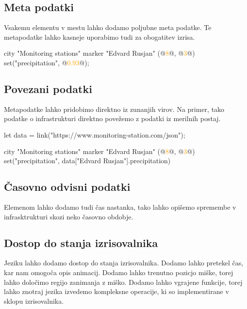 \documentclass{article}
\newcommand\Num[1]{\textcolor{orange}{#1}}
\begin{document}
\subsection{Meta podatki}
Vsakemu elementu v mestu lahko dodamo poljubne meta podatke.
Te metapodatke lahko kasneje uporabimo tudi za obogatitev izrisa.

\begin{CITY}
  city "Monitoring stations" {
    marker "Edvard Rusjan" (@\Num{8}@, @\Num{3}@) {
      set("precipitation", @\Num{0.93}@);
    }
  }
\end{CITY}

\subsection{Povezani podatki}
Metapodatke lahko pridobimo direktno iz zunanjih virov.
Na primer, tako podatke o infrastrukturi direktno povežemo z podatki iz merilnih postaj.

\begin{CITY}
  let data = link("https://www.monitoring-station.com/json");

  city "Monitoring stations" {
    marker "Edvard Rusjan" (@\Num{8}@, @\Num{3}@) {
      set("precipitation", data["Edvard Rusjan"].precipitation)
    }
  }
\end{CITY}

\subsection{Časovno odvisni podatki}
Elemenom lahko dodamo tudi čas nastanka, tako lahko opišemo spremembe v infrasktrukturi skozi neko časovno obdobje.

\subsection{Dostop do stanja izrisovalnika}

Jeziku lahko dodamo dostop do stanja izrisovalnika.
Dodamo lahko pretekel čas, kar nam omogoča opis animacij.
Dodamo lahko trenutno pozicjo miške, torej lahko določimo regijo zanimanja z miško.
Dodamo lahko vgrajene funkcije, torej lahko znotraj jezika izvedemo kompleksne operacije, ki so implementirane v sklopu izrisovalnika.
\end{document}
